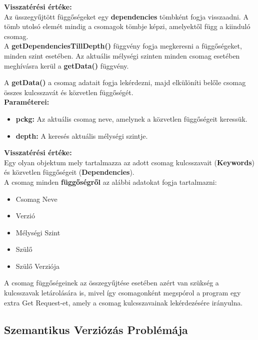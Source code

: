 \noindent \textbf{Visszatérési értéke:} \\

Az üsszegyűjtött függőségeket egy \textbf{dependencies} tömbként fogja visszaadni. A tömb utolsó elemét mindig a csomagok tömbje képzi, amelyektől függ a kiinduló csomag.\\

A \textbf{getDependenciesTillDepth()} függvény fogja megkeresni a függőségeket, minden szint esetében. Az aktuális mélységi szinten minden csomag esetében meghívásra kerül a \textbf{getData()} függvény.
\pagebreak

A \textbf{getData()} a csomag adatait fogja lekérdezni, majd elkülöníti belőle csomag összes kulcsszavát és közvetlen függőségét.\\ 

\noindent \textbf{Paraméterei:}

\begin{itemize}
	\item \textbf{pckg: }Az aktuális csomag neve, amelynek a közvetlen függőségeit keressük.
	\item \textbf{depth: }A keresés aktuális mélységi szintje.
\end{itemize}

\noindent \textbf{Visszatérési értéke:} \\

Egy olyan objektum mely tartalmazza az adott csomag kulcsszavait (\textbf{Keywords}) és közvetlen függőségeit (\textbf{Dependencies}).\\

\noindent A csomag minden \textbf{függőségről} az alábbi adatokat fogja tartalmazni:
\begin{itemize}
	\item Csomag Neve
	\item Verzió
	\item Mélységi Szint
	\item Szülő
	\item Szülő Verziója
\end{itemize}

A csomag függőségeinek az összegyűjtése esetében azért van szükség a kulcsszavak letárolására is, mivel így csomagonként megspórol a program egy extra Get Request-et, amely a csomag kulcsszavainak lekérdezésére irányulna.

\subsection{Szemantikus Verziózás Problémája}

